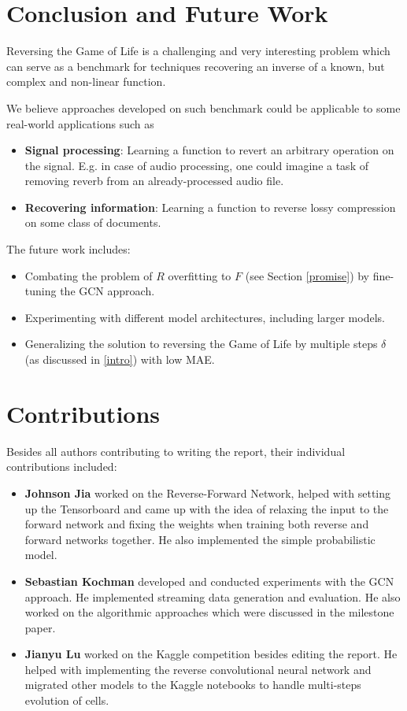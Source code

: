 \documentclass[conference]{IEEEtran}
\begin{document}
\section{Conclusion and Future Work}

Reversing the Game of Life is a challenging and very interesting problem which can serve as a benchmark for techniques recovering an inverse of a known, but complex and non-linear function.

We believe approaches developed on such benchmark could be applicable to some real-world applications such as
\begin{itemize}
    \item \textbf{Signal processing}: Learning a function to revert an arbitrary operation on the signal. E.g. in case of audio processing, one could imagine a task of removing reverb from an already-processed audio file. 
    \item \textbf{Recovering information}: Learning a function to reverse lossy compression on some class of documents.
\end{itemize}

The future work includes:
\begin{itemize}
    \item Combating the problem of $R$ overfitting to $F$ (see Section \ref{promise}) by fine-tuning the GCN approach.
    \item Experimenting with different model architectures, including larger models.
    \item Generalizing the solution to reversing the Game of Life by multiple steps $\delta$ (as discussed in \ref{intro}) with low MAE.
\end{itemize}

\section{Contributions}
Besides all authors contributing to writing the report, their individual contributions included:

\begin{itemize}
    \item \textbf{Johnson Jia} worked on the Reverse-Forward Network, helped with setting up the Tensorboard and came up with the idea of relaxing the input to the forward network and fixing the weights when training both reverse and forward networks together. He also implemented the simple probabilistic model.

    \item \textbf{Sebastian Kochman} developed and conducted experiments with the GCN approach. He implemented streaming data generation and evaluation. He also worked on the algorithmic approaches which were discussed in the milestone paper.

    \item \textbf{Jianyu Lu} worked on the Kaggle competition besides editing the report. He helped with implementing the reverse convolutional neural network and migrated other models to the Kaggle notebooks to handle multi-steps evolution of cells.

\end{itemize}


%
%


\end{document}
